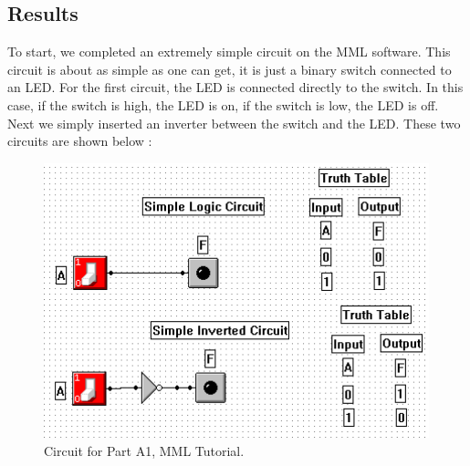 \documentclass[a4paper,11pt]{article}
\begin{document}
\subsection{Results}
To start, we completed an extremely simple circuit on the MML software. This circuit is about as simple as one can get, it is just a binary switch connected to an LED. For the first circuit, the LED is connected directly to the switch. In this case, if the switch is high, the LED is on, if the switch is low, the LED is off. Next we simply inserted an inverter between the switch and the LED. These two circuits are shown below :  
\begin{figure}[h!]
   \centering
     \includegraphics[width=4.4in]{PartACircuit}
   \caption{Circuit for Part A1, MML Tutorial.}
   \label{fig:tutorial}
\end{figure} 
\end{document}
